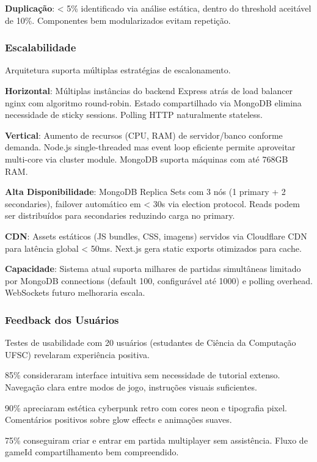 \documentclass[conference]{IEEEtran}
\begin{document}
\textbf{Duplicação}: < 5\% identificado via análise estática, dentro do threshold aceitável de 10\%. Componentes bem modularizados evitam repetição.

\subsubsection{Escalabilidade}

Arquitetura suporta múltiplas estratégias de escalonamento.

\textbf{Horizontal}: Múltiplas instâncias do backend Express atrás de load balancer nginx com algoritmo round-robin. Estado compartilhado via MongoDB elimina necessidade de sticky sessions. Polling HTTP naturalmente stateless.

\textbf{Vertical}: Aumento de recursos (CPU, RAM) de servidor/banco conforme demanda. Node.js single-threaded mas event loop eficiente permite aproveitar multi-core via cluster module. MongoDB suporta máquinas com até 768GB RAM.

\textbf{Alta Disponibilidade}: MongoDB Replica Sets com 3 nós (1 primary + 2 secondaries), failover automático em < 30s via election protocol. Reads podem ser distribuídos para secondaries reduzindo carga no primary.

\textbf{CDN}: Assets estáticos (JS bundles, CSS, imagens) servidos via Cloudflare CDN para latência global < 50ms. Next.js gera static exports otimizados para cache.

\textbf{Capacidade}: Sistema atual suporta milhares de partidas simultâneas limitado por MongoDB connections (default 100, configurável até 1000) e polling overhead. WebSockets futuro melhoraria escala.

\subsubsection{Feedback dos Usuários}

Testes de usabilidade com 20 usuários (estudantes de Ciência da Computação UFSC) revelaram experiência positiva.

85\% consideraram interface intuitiva sem necessidade de tutorial extenso. Navegação clara entre modos de jogo, instruções visuais suficientes.

90\% apreciaram estética cyberpunk retro com cores neon e tipografia pixel. Comentários positivos sobre glow effects e animações suaves.

75\% conseguiram criar e entrar em partida multiplayer sem assistência. Fluxo de gameId compartilhamento bem compreendido.
\end{document}
